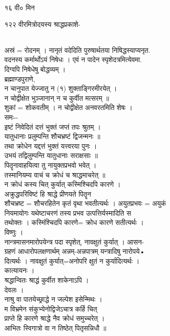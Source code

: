 \documentclass[11pt, openany]{book}
\begin{document}
{{{{{{{{{{१६ वी० मिन

{१२२ }{ वीरमित्रोदयस्य श्राद्धप्रकाशे-}{\\
अस्रं = रोदनम् । नानृतं वदेदिति पुरुषार्थतया निषिद्धस्याप्यनृत.\\
वदनस्य कर्मार्थोऽयं निषेधः । एवं न पादेन स्पृशेदत्रमित्येवमा.\\
दिग्वपि निषेधेषु बोद्धव्यम् ।\\
ब्रह्माण्डपुराणे,\\
न चानुपात येज्जातु न (१) शुक्ताङ्गिरमीरयेत् ।\\
न चोद्वीक्षेत भुञ्जानान् न च कुर्वीत मत्सरम् ॥\\
शुकां = शोकवतीम् । न चोद्वीक्षेत अनवरतमिति शेषः ।\\
समः-\/-\\
इष्टं निवेदितं दत्तं भुक्तं जप्तं तपः श्रुतम् ।\\
यातुधानाः प्रलुम्पन्ति शौचभ्रष्टं द्विजन्मनः ॥\\
तथा क्रोधेन यद्दत्तं भुक्तं यत्त्वरया पुनः ।\\
उभयं तद्विलुम्पन्ति यातुधानाः सराक्षसाः ॥\\
पितॄनावाहयित्वा तु नायुक्तप्रभवो भवेत् ।\\
तस्मानियम्य वाचं च क्रोधं च श्राद्धमाचरेत् ॥\\
न क्रोधं कस्य चित् कुर्यात् कस्मिश्चिदपि कारणे ।\\
अक्रुद्धपरिविष्टं हि श्राद्धे प्रीणयते पितॄन \textbar{}\textbar{}\\
शौचभ्रष्ट = शौचरहितेन कृतं वृथा भवतीत्यर्थः । अयुतप्रभवः = अयुकं\\
नियमायोगः यथेष्टाचरणं तस्य प्रभव उत्पत्तिर्यस्मादिति स\\
तथोक्तः । कस्मिंश्चिदपि कारणे= क्रोध कारणे सतीत्यर्थः ।\\
विष्णुः ।\\
नान्त्रमासनमारोपयेन्त्र पदा स्पृशेत्, नावक्षुतं कुर्यात् । आसन-\\
ग्रहणं आधारोपलक्षणार्थम् \textbar{} अन्नम्-अन्नपात्रम् \textbar{}
यन्त्रादिषु नारोपये•\\
दित्यर्थः । नावक्षुतं कुर्यात्=अनोपरि क्षुतं न कुर्यादित्यर्थः ।\\
कात्यायनः ।\\
श्रद्धान्वितः श्राद्धं कुर्वीत शाकेनाऽपि ।\\
देवलः ।\\
नाश्रु वा पातयेच्छ्राद्धे न जल्पेश इसेन्मिथः ।\\
म विभ्रमेन संकुभ्येनोद्विजेऽचात्र कर्हि चित् \textbar{}\textbar{}\\
प्राप्ते हि कारणे श्राद्धे नैव क्रोधं समुच्चरेत् ।\\
आभितः स्विगात्रो वा न तिष्ठेत् पितृसन्निधौ ॥

}}}}}}}}}}}
\end{document}
